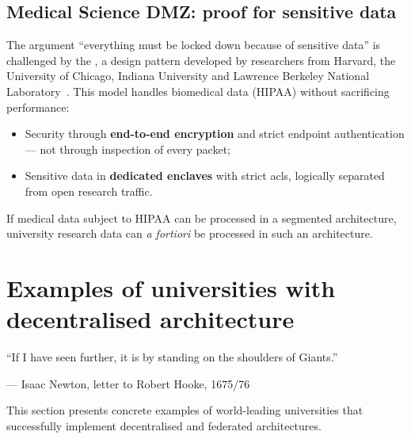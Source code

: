 \subsection{Medical Science DMZ: proof for sensitive data}
\label{subsec:medical-dmz}

The argument ``everything must be locked down because of sensitive
data'' is challenged by the , a design pattern
developed by researchers from Harvard, the University of Chicago,
Indiana University and Lawrence Berkeley National Laboratory~\cite{medical-sdmz}. This model handles
biomedical data (HIPAA) without sacrificing performance:

\begin{itemize}[nosep]
    \item Security through \textbf{end-to-end encryption} and strict
    endpoint authentication --- not through inspection of every packet;
    \item Sensitive data in \textbf{dedicated enclaves} with strict
    \gls{acl}s, logically separated from open research traffic.
\end{itemize}

If medical data subject to HIPAA can be processed in a segmented
architecture, university research data can \emph{a fortiori} be processed in such an architecture.

\section{Examples of universities with decentralised architecture}
\label{sec:exemples}

\epigraph{``If I have seen further, it is by standing on the shoulders of Giants.''}{--- Isaac Newton, letter to Robert Hooke, 1675/76~\cite{newton1675}}

This section presents concrete examples of world-leading universities
that successfully implement decentralised and federated architectures.

